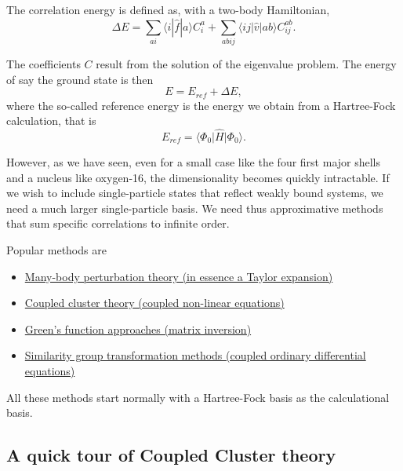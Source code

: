 \noindent
The correlation energy is defined as, with a two-body Hamiltonian,  
\[
\Delta E=\sum_{ai}\langle i| \hat{f}|a \rangle C_{i}^{a}+
\sum_{abij}\langle ij | \hat{v}| ab \rangle C_{ij}^{ab}.
\]

The coefficients $C$ result from the solution of the eigenvalue problem. 
The energy of say the ground state is then
\[
E=E_{ref}+\Delta E,
\]
where the so-called reference energy is the energy we obtain from a Hartree-Fock calculation, that is
\[
E_{ref}=\langle \Phi_0 \vert \hat{H} \vert \Phi_0 \rangle.
\]

However, as we have seen, even for a small case like the four first major shells and a nucleus like oxygen-16, the dimensionality becomes quickly intractable. If we wish to include single-particle states that reflect weakly bound systems, we need a much larger single-particle basis. We need thus approximative methods that sum specific correlations to infinite order. 

Popular methods are
\begin{itemize}
\item \href{{http://www.sciencedirect.com/science/journal/03701573/261/3-4}}{Many-body perturbation theory (in essence a Taylor expansion)}

\item \href{{http://iopscience.iop.org/0034-4885/77/9/096302}}{Coupled cluster theory (coupled non-linear equations)}

\item \href{{http://www.worldscientific.com/worldscibooks/10.1142/6821}}{Green's function approaches (matrix inversion)}

\item \href{{http://journals.aps.org/prc/abstract/10.1103/PhysRevC.85.061304}}{Similarity group transformation methods (coupled ordinary differential equations)}
\end{itemize}

\noindent
All these methods start normally with a Hartree-Fock basis as the calculational basis. 


\subsection{A quick tour of Coupled Cluster theory}

